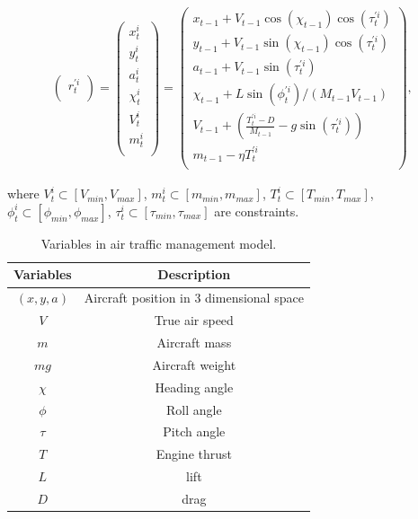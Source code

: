 \begin{equation}
\begin{aligned}
  \begin{pmatrix}
    r^{'i}_{t}    \\ 
  \end{pmatrix}
  =
  \begin{pmatrix}
    x^i_{t}    \\ 
    y^i_{t}    \\ 
    a^i_{t}    \\ 
    \chi^i_{t} \\ 
    V^i_{t}    \\ 
    m^i_{t}    \\ 
  \end{pmatrix}
  =
  \begin{pmatrix}
    x_{t-1}   + V_{t-1} \cos(\chi_{t-1}) \cos(\tau^{'i}_{t}) \\
    y_{t-1}   + V_{t-1} \sin(\chi_{t-1}) \cos(\tau^{'i}_{t}) \\ 
    a_{t-1}   + V_{t-1} \sin(\tau^{'i}_{t}) \\
    \chi_{t-1} + L \sin(\phi^{'i}_{t})/(M_{t-1} V_{t-1}) \\
    V_{t-1}   + (\frac{T^{'i}_{t}-D}{M_{t-1}} - g \sin(\tau^{'i}_{t})) \\
    m_{t-1}   - \eta T^{'i}_{t}  \\
  \end{pmatrix}
	\mbox{, }
\end{aligned}
\label{eq:atm_s}
\end{equation}

where $V^i_{t} \subset [V_{min}, V_{max}]$, $m^i_{t} \subset [m_{min}, m_{max}]$, $T^i_{t} \subset [T_{min}, T_{max}]$, $\phi^i_{t} \subset [\phi_{min}, \phi_{max}]$, $\tau^i_{t} \subset [\tau_{min}, \tau_{max}]$ are constraints.

\begin{table}
	\setlength{\tabcolsep}{3pt}
	\begin{spacing}{1.0}
	\caption{Variables in air traffic management model.}
	\label{tab:atm_variables}
	\footnotesize
	\centering
	\smallskip
		\begin{tabular}{c|c}
			\hline
			 Variables & Description\\
			\hline
			\hline
			$(x,y,a)$ & Aircraft position in 3 dimensional space \\
			$V$ & True air speed \\
			$m$ & Aircraft mass \\
			$mg$ & Aircraft weight \\
			$\chi$ & Heading angle \\
			$\phi$ & Roll angle \\
			$\tau$ & Pitch angle \\
			$T$ & Engine thrust \\
			$L$ & lift \\
			$D$ & drag \\
			\hline
		\end{tabular}
		\end{spacing}
\end{table}

